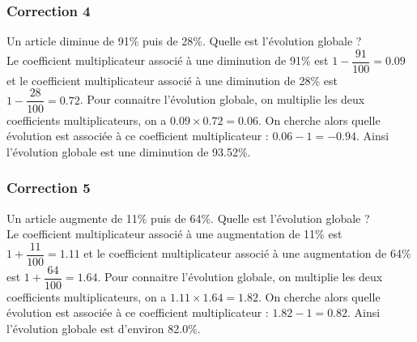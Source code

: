 \documentclass[15pt, mathserif]{beamer}
\begin{document}
\begin{frame}
\vspace{-10mm}
	\frametitle{Correction 4}
\vspace*{1cm} Un article diminue de 91\% puis de 28\%. Quelle est l'évolution globale ? \\ Le coefficient multiplicateur associé à une diminution de 91\% est $1-\dfrac{91}{100} = 0.09$ et le coefficient multiplicateur associé à une diminution de 28\% est $1-\dfrac{28}{100} = 0.72$. Pour connaitre l'évolution globale, on multiplie les deux coefficients multiplicateurs, on a $ 0.09 \times 0.72=0.06$. On cherche alors quelle évolution est associée à ce coefficient multiplicateur : $0.06-1 =-0.94$. Ainsi l'évolution globale est une diminution de 93.52\%. 
 \begin{center} 
 \end{center}\end{frame}


\begin{frame}
\vspace{-10mm}
	\frametitle{Correction 5}
\vspace*{1cm} Un article augmente de 11\% puis de 64\%. Quelle est l'évolution globale ? \\ Le coefficient multiplicateur associé à une augmentation de 11\% est $1+\dfrac{11}{100} = 1.11$ et le coefficient multiplicateur associé à une augmentation de 64\% est $1+\dfrac{64}{100} = 1.64$. Pour connaitre l'évolution globale, on multiplie les deux coefficients multiplicateurs, on a $ 1.11 \times 1.64=1.82$. On cherche alors quelle évolution est associée à ce coefficient multiplicateur : $1.82-1 =0.82$. Ainsi l'évolution globale est d'environ 82.0\%. 
 \begin{center} 
 \end{center}\end{frame}
\end{document}
